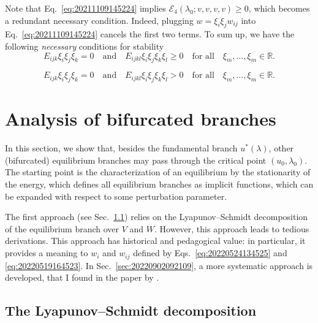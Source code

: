 \documentclass[12pt, final]{scrartcl}
\theoremstyle{definition}
\newcommand{\E}{\mathcal E}
\newcommand{\reals}{\mathbb{R}}
\begin{document}
Note that Eq.~\eqref{eq:20211109145224} implies $\E_4(\lambda_0; v, v, v, v) ≥ 0$,
which becomes a redundant necessary condition. Indeed, plugging
$w= \xi_i \xi_j w_{ij}$ into Eq.~\eqref{eq:20211109145224} cancels the first two
terms. To sum up, we have the following \emph{necessary} conditions for
stability
\begin{equation}
  E_{ijk} \xi_i \xi_j \xi_k = 0 \quad \text{and} \quad E_{ijkl} \xi_i \xi_j \xi_k \xi_l ≥ 0 \quad \text{for all} \quad \xi_m, \ldots, \xi_m \in \reals.
\end{equation}

\begin{equation}
  E_{ijk} \xi_i \xi_j \xi_k = 0 \quad \text{and} \quad E_{ijkl} \xi_i \xi_j \xi_k \xi_l > 0 \quad \text{for all} \quad \xi_m, \ldots, \xi_m \in \reals.
\end{equation}

\section{Analysis of bifurcated branches}
\label{sec:20220617075558}

In this section, we show that, besides the fundamental branch $u^\ast(\lambda)$,
other (bifurcated) equilibrium branches may pass through the critical point
$(u_0, \lambda_0)$. The starting point is the characterization of an equilibrium by
the stationarity of the energy, which defines all equilibrium branches as
implicit functions, which can be expanded with respect to some perturbation
parameter.

The first approach (see Sec.~\ref{sec:20220902091527}) relies on the
Lyapunov--Schmidt decomposition of the equilibrium branch over $V$ and
$W$. However, this approach leads to tedious derivations. This approach has
historical and pedagogical value: in particular, it provides a meaning to
$w_i$ and $w_{ij}$ defined by Eqs.~\eqref{eq:20220524134525} and
\eqref{eq:20220519164523}. In Sec.~\ref{sec:20220902092109}, a more systematic
approach is developed, that I found in the paper by \textcite[][Appendix
A]{chak2018}.

\subsection{The Lyapunov--Schmidt decomposition}
\label{sec:20220902091527}
\end{document}
